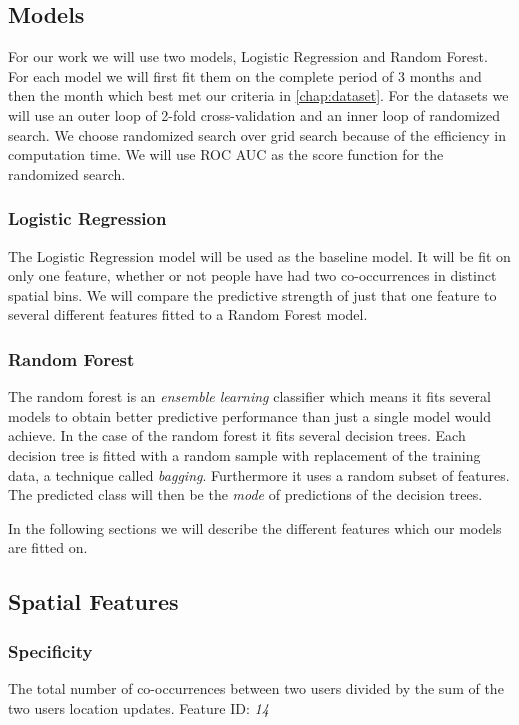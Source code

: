 \subsection{Models}
For our work we will use two models, Logistic Regression and Random Forest. For each model we will first fit them on the complete period of 3 months and then the month which best met our criteria in \autoref{chap:dataset}. For the datasets we will use an outer loop of 2-fold cross-validation and an inner loop of randomized search. We choose randomized search over grid search because of the efficiency in computation time. We will use ROC AUC as the score function for the randomized search.


\subsubsection{Logistic Regression}
The Logistic Regression model will be used as the baseline model. It will be fit on only one feature, whether or not people have had two co-occurrences in distinct spatial bins. We will compare the predictive strength of just that one feature to several different features fitted to a Random Forest model.

\subsubsection{Random Forest}
The random forest is an \textit{ensemble learning} classifier which means it fits several models to obtain better predictive performance than just a single model would achieve. In the case of the random forest it fits several decision trees. Each decision tree is fitted with a random sample with replacement of the training data, a technique called \textit{bagging}. Furthermore it uses a random subset of features. The predicted class will then be the \textit{mode} of predictions of the decision trees.

In the following sections we will describe the different features which our models are fitted on.

\subsection{Spatial Features}

\subsubsection{Specificity}
The total number of co-occurrences between two users divided by the sum of the two users location updates. Feature ID: \textit{14}

